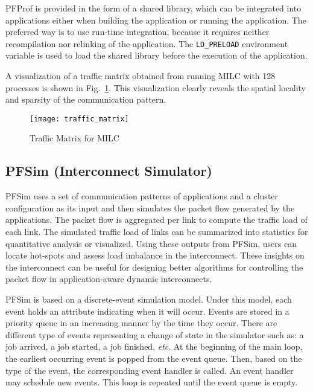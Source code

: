 PFProf is provided in the form of a shared library, which can be
integrated into applications either when building the application or
running the application. The preferred way is to use run-time
integration, because it requires neither recompilation nor relinking of
the application. The \lstinline!LD_PRELOAD! environment
variable is used to load the shared library before the execution of the
application.

A visualization of a traffic matrix obtained from running MILC with 128
processes is shown in Fig.~\ref{fig:traffic-matrix}. This visualization
clearly reveals the spatial locality and sparsity of the communication
pattern.

\begin{figure}
    \centering
    \texttt{[image: traffic\_matrix]}
    \caption{Traffic Matrix for MILC}%
    \label{fig:traffic-matrix}
\end{figure}

\subsection{PFSim (Interconnect Simulator)}\label{sec:ii-pfsim}

PFSim uses a set of communication patterns of applications and a cluster
configuration as its input and then simulates the packet flow generated
by the applications. The packet flow is aggregated per link to compute
the traffic load of each link. The simulated traffic load of links can
be summarized into statistics for quantitative analysis or visualized.
Using these outputs from PFSim, users can locate hot-spots and assess
load imbalance in the interconnect. These insights on the interconnect
can be useful for designing better algorithms for controlling the packet
flow in application-aware dynamic interconnects.

PFSim is based on a discrete-event simulation model. Under this model,
each event holds an attribute indicating when it will occur. Events are
stored in a priority queue in an increasing manner by the time they
occur. There are different type of events representing a change of state
in the simulator such as: a job arrived, a job started, a job finished,
\emph{etc}. At the beginning of the main loop, the earliest occurring
event is popped from the event queue. Then, based on the type of the
event, the corresponding event handler is called. An event handler may
schedule new events. This loop is repeated until the event queue is
empty.

